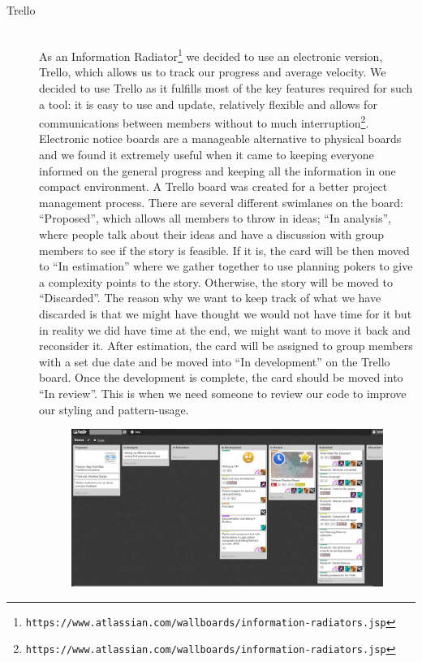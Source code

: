 \documentclass[11pt]{article}
\begin{document}
\begin{description}
  \item[Trello] \hfill \\
  As an Information Radiator\footnote{\tt{https://www.atlassian.com/wallboards/information-radiators.jsp}} we decided to use an electronic version, Trello, which allows us to track our progress and average velocity. We decided to use Trello as it fulfills most of the key features required for such a tool: it is easy to use and update, relatively flexible and allows for communications between members without to much interruption\footnote{\tt{https://www.atlassian.com/wallboards/information-radiators.jsp}}. Electronic notice boards are a manageable alternative to physical boards and we found it extremely useful when it came to keeping everyone informed on the general progress and keeping all the information in one compact environment. 
  A Trello board was created for a better project management process. There are several different swimlanes on the board: ``Proposed'', which allows all members to throw in ideas; ``In analysis'', where people talk about their ideas and have a discussion with group members to see if the story is feasible. If it is, the card will be then moved to ``In estimation'' where we gather together to use planning pokers to give a complexity points to the story. Otherwise, the story will be moved to ``Discarded''. The reason why we want to keep track of what we have discarded is that we might have thought we would not have time for it but in reality we did have time at the end, we might want to move it back and reconsider it. After estimation, the card will be assigned to group members with a set due date and be moved into ``In development'' on the Trello board. Once the development is complete, the card should be moved into ``In review''. This is when we need someone to review our code to improve our styling and pattern-usage.  
\begin{figure}[h!]
\centering
\includegraphics[width=\textwidth]{Trello.png}

\end{figure}
\end{description}
\end{document}

